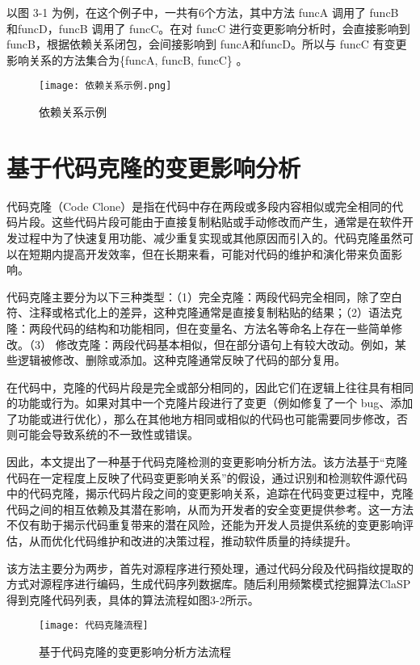 以图 3-1 为例，在这个例子中，一共有6个方法，其中方法 funcA 调用了 funcB 和funcD，funcB 调用了 funcC。在对 funcC 进行变更影响分析时，会直接影响到 funcB，根据依赖关系闭包，会间接影响到 funcA和funcD。所以与 funcC 有变更影响关系的方法集合为\{funcA, funcB, funcC\} 。

\begin{figure}[h]
\centering
\texttt{[image: 依赖关系示例.png]}
\caption{依赖关系示例}
\end{figure}

\section{基于代码克隆的变更影响分析}
代码克隆（Code Clone）是指在代码中存在两段或多段内容相似或完全相同的代码片段。这些代码片段可能由于直接复制粘贴或手动修改而产生，通常是在软件开发过程中为了快速复用功能、减少重复实现或其他原因而引入的。代码克隆虽然可以在短期内提高开发效率，但在长期来看，可能对代码的维护和演化带来负面影响。

代码克隆主要分为以下三种类型：（1）完全克隆：两段代码完全相同，除了空白符、注释或格式化上的差异，这种克隆通常是直接复制粘贴的结果；（2）语法克隆：两段代码的结构和功能相同，但在变量名、方法名等命名上存在一些简单修改。（3） 修改克隆：两段代码基本相似，但在部分语句上有较大改动。例如，某些逻辑被修改、删除或添加。这种克隆通常反映了代码的部分复用。


在代码中，克隆的代码片段是完全或部分相同的，因此它们在逻辑上往往具有相同的功能或行为。如果对其中一个克隆片段进行了变更（例如修复了一个 bug、添加了功能或进行优化），那么在其他地方相同或相似的代码也可能需要同步修改，否则可能会导致系统的不一致性或错误。

因此，本文提出了一种基于代码克隆检测的变更影响分析方法。该方法基于“克隆代码在一定程度上反映了代码变更影响关系”的假设，通过识别和检测软件源代码中的代码克隆，揭示代码片段之间的变更影响关系，追踪在代码变更过程中，克隆代码之间的相互依赖及其潜在影响，从而为开发者的安全变更提供参考。这一方法不仅有助于揭示代码重复带来的潜在风险，还能为开发人员提供系统的变更影响评估，从而优化代码维护和改进的决策过程，推动软件质量的持续提升。

该方法主要分为两步，首先对源程序进行预处理，通过代码分段及代码指纹提取的方式对源程序进行编码，生成代码序列数据库。随后利用频繁模式挖掘算法ClaSP得到克隆代码列表，具体的算法流程如图3-2所示。

\begin{figure}[h]
\centering
\texttt{[image: 代码克隆流程]}
\caption{基于代码克隆的变更影响分析方法流程}
\end{figure}



